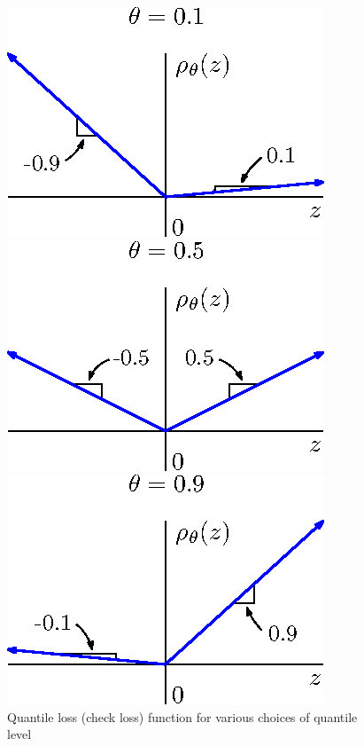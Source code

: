 \begin{figure}[ht]
  \caption[Quantile loss function]{Quantile loss (check loss) function for
    various choices of quantile level}
  \label{fig:quantile-loss}
  \vspace{5mm}

  \begin{minipage}[t]{0.33\linewidth}
    \centering
    \includegraphics{check-loss-0-1}
  \end{minipage}
  \begin{minipage}[t]{0.33\linewidth}
    \centering
    \includegraphics{check-loss-0-5}
  \end{minipage}
  \begin{minipage}[t]{0.33\linewidth}
    \centering
    \includegraphics{check-loss-0-9}
  \end{minipage}
  
\end{figure}


